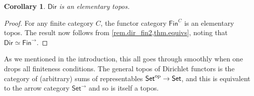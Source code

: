 \documentclass[11pt, article, one side]{memoir}
\theoremstyle{theorem}
\newtheorem{corollary}[section]{Corollary}
\theoremstyle{definition}
\theoremstyle{remark}
\newcommand{\Cat}[1]{\mathsf{#1}}%
\newcommand{\op}{^\tn{op}}
\newcommand{\tn}[1]{\textnormal{#1}}
\newcommand{\ol}[1]{\overline{#1}}
\newcommand{\smset}{\Cat{Set}}
\newcommand{\finset}{\Cat{Fin}}
\newcommand{\bun}{\Cat{Bun}}
\newcommand{\yon}{\mathcal{y}}
\newcommand{\poly}{\Cat{Poly}}
\newcommand{\dir}{\Cat{Dir}}
\newcommand{\ff}{\mathbb{F}}
\begin{document}
\begin{corollary}\label{cor.dir_topos}
$\dir$ is an elementary topos.
\end{corollary}
\begin{proof}
For any finite category $C$, the functor category $\finset^C$ is an elementary topos. The result now follows from \cref{rem.dir_fin2,thm.equivs}, noting that $\dir \simeq \finset^{\to}$.
\end{proof}

As we mentioned in the introduction, this all goes through smoothly when one drops all finiteness conditions. The general topos of Dirichlet functors is the category of (arbitrary) sums of representables $\smset\op \to \smset$, and this is equivalent to the arrow category $\smset^{\to}$ and so is itself a topos.

%
%
%
\end{document}
